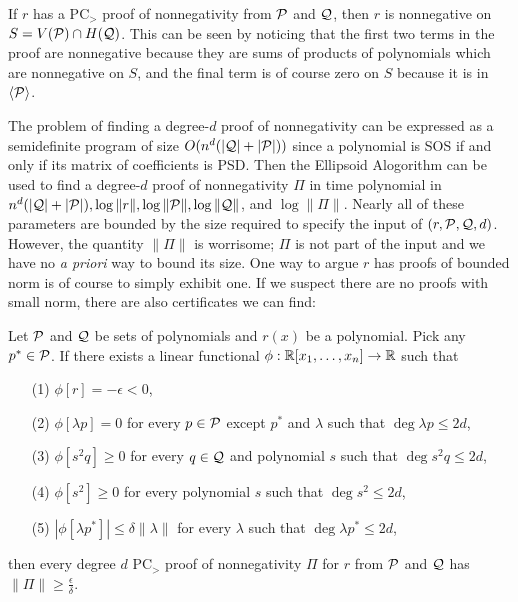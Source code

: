 If $r$ has a PC$_>$ proof of nonnegativity from $\mathcal P$ and $\mathcal Q$, then $r$ is nonnegative on $S = V(\mathcal P) \cap H(\mathcal Q)$. This can be seen by noticing that the first two terms in the proof are nonnegative because they are sums of products of polynomials which are nonnegative on $S$, and the final term is of course zero on $S$ because it is in $\langle \mathcal P \rangle$. 

The problem of finding a degree-$d$ proof of nonnegativity can be expressed as a semidefinite program of size $O(n^d(|\mathcal Q| + |\mathcal P|))$ since a polynomial is SOS if and only if its matrix of coefficients is PSD. Then the Ellipsoid Alogorithm can be used to find a degree-$d$ proof of nonnegativity $\Pi$ in time polynomial in $n^{d}(|\mathcal Q| + |\mathcal P|), \log \|r\|, \log \|\mathcal P\|, \log \|\mathcal Q\|$,  and $\log \|\Pi\|$. Nearly all of these parameters are bounded by the size required to specify the input of $(r,\mathcal P,\mathcal Q,d)$. However, the quantity $\|\Pi\|$ is worrisome; $\Pi$ is not part of the input and we have no \emph{a priori} way to bound its size. One way to argue $r$ has proofs of bounded norm is of course to simply exhibit one. If we suspect there are no proofs with small norm, there are also certificates we can find:
\begin{lemma}\label{lem:prelim_dual_cert}
Let $\mathcal P$ and $\mathcal Q$ be sets of polynomials and $r(x)$ be a polynomial. Pick any $p^* \in \mathcal P$. If there exists a linear functional $\phi: \mathbb R[x_1,\dots,x_n] \rightarrow \mathbb R$ such that 
\begin{enumerate}
\item[(1)] $\phi[r] = -\epsilon < 0$,
\item[(2)] $\phi[\lambda p] = 0$ for every $p \in \mathcal P$ except $p^*$ and $\lambda$ such that $\deg \lambda p \leq 2d$,
\item[(3)] $\phi[s^2q] \geq 0$ for every $q \in \mathcal Q$ and polynomial $s$ such that $\deg s^2q \leq 2d$,
\item[(4)] $\phi[s^2] \geq 0$ for every polynomial $s$ such that $\deg s^2 \leq 2d$,
\item[(5)] $|\phi[\lambda p^*]| \leq \delta \|\lambda\|$ for every $\lambda$ such that $\deg \lambda p^* \leq 2d$,
\end{enumerate}
then every degree $d$ PC$_>$ proof of nonnegativity $\Pi$ for $r$ from $\mathcal P$ and $\mathcal Q$ has $\|\Pi\| \geq \frac{\epsilon}{\delta}$.
\end{lemma}
